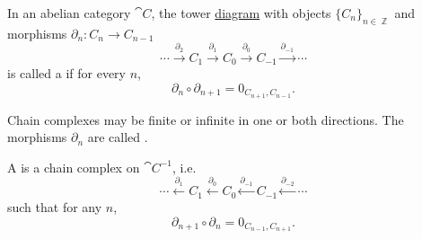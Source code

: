 \begin{definition}\label{def:chain_complex}
  In an abelian category \( \cat{C} \), the tower \hyperref[def:tower_diagram]{diagram} with objects \( \{ C_n \}_{n \in \BbbZ} \) and morphisms \( \partial_n: C_n \to C_{n-1} \)
  \begin{equation}\label{def:chain_complex/chain_diagram}
    \cdots
    \overset {\partial_2} \longrightarrow
    C_1
    \overset {\partial_1} \longrightarrow
    C_0
    \overset {\partial_0} \longrightarrow
    C_{-1}
    \overset {\partial_{-1}} \longrightarrow
    \cdots
  \end{equation}
  is called a  if for every \( n \),
  \begin{equation*}
    \partial_n \circ \partial_{n+1} = 0_{C_{n+1},C_{n-1}}.
  \end{equation*}

  Chain complexes may be finite or infinite in one or both directions. The morphisms \( \partial_n \) are called .

  A  is a chain complex on \( \cat{C}^{-1} \), i.e.
  \begin{equation}\label{def:chain_complex/cochain_diagram}
    \cdots
    \overset {\partial_1} \longleftarrow
    C_1
    \overset {\partial_0} \longleftarrow
    C_0
    \overset {\partial_{-1}} \longleftarrow
    C_{-1}
    \overset {\partial_{-2}} \longleftarrow
    \cdots
  \end{equation}
  such that for any \( n \),
  \begin{equation*}
    \partial_{n+1} \circ \partial_n = 0_{C_{n-1},C_{n+1}}.
  \end{equation*}
\end{definition}
